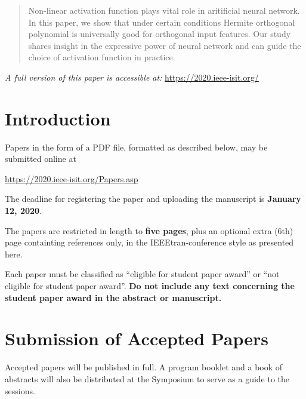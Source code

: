 \documentclass[conference,letterpaper]{IEEEtran}
\begin{document}
\begin{abstract}
Non-linear activation function plays vital role in aritificial neural network.
In this paper, we show that under certain conditions Hermite orthogonal polynomial
is universally good for orthogonal input features. Our study shares insight in the expressive
power of neural network and can guide the choice of activation function in practice.
\end{abstract}


\textit{A full version of this paper is accessible at:}
\url{https://2020.ieee-isit.org/} 

\section{Introduction}

Papers in the form of a PDF file, formatted as described below, may be
submitted online at
\begin{center}
  \url{https://2020.ieee-isit.org/Papers.asp}
\end{center}
The deadline for registering the paper and uploading the manuscript is \textbf{January 12, 2020}.

The papers are restricted in length to \textbf{five pages}, plus an optional extra (6th) page containting references only, in the IEEEtran-conference style as
presented here.

Each paper must be classified as ``eligible for student paper award''
or ``not eligible for student paper award''. \textbf{Do not include any text concerning the student paper award in the abstract or manuscript.}


\section{Submission of Accepted Papers}

Accepted papers will be published in full. 
A program booklet and a book of abstracts will also be
distributed at the Symposium to serve as a guide to the sessions.
\end{document}
